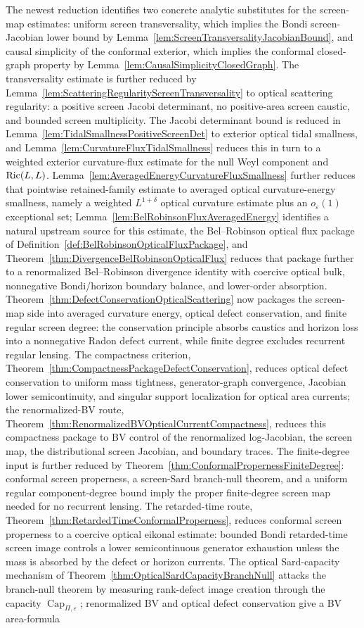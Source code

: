 The newest reduction identifies two concrete analytic substitutes for the screen-map estimates: uniform screen transversality, which implies the Bondi screen-Jacobian lower bound by Lemma~\ref{lem:ScreenTransversalityJacobianBound}, and causal simplicity of the conformal exterior, which implies the conformal closed-graph property by Lemma~\ref{lem:CausalSimplicityClosedGraph}. The transversality estimate is further reduced by Lemma~\ref{lem:ScatteringRegularityScreenTransversality} to optical scattering regularity: a positive screen Jacobi determinant, no positive-area screen caustic, and bounded screen multiplicity. The Jacobi determinant bound is reduced in Lemma~\ref{lem:TidalSmallnessPositiveScreenDet} to exterior optical tidal smallness, and Lemma~\ref{lem:CurvatureFluxTidalSmallness} reduces this in turn to a weighted exterior curvature-flux estimate for the null Weyl component and $\mathrm{Ric}(L,L)$. Lemma~\ref{lem:AveragedEnergyCurvatureFluxSmallness} further reduces that pointwise retained-family estimate to averaged optical curvature-energy smallness, namely a weighted $L^{1+\delta}$ optical curvature estimate plus an $o_\varepsilon(1)$ exceptional set; Lemma~\ref{lem:BelRobinsonFluxAveragedEnergy} identifies a natural upstream source for this estimate, the Bel--Robinson optical flux package of Definition~\ref{def:BelRobinsonOpticalFluxPackage}, and Theorem~\ref{thm:DivergenceBelRobinsonOpticalFlux} reduces that package further to a renormalized Bel--Robinson divergence identity with coercive optical bulk, nonnegative Bondi/horizon boundary balance, and lower-order absorption. Theorem~\ref{thm:DefectConservationOpticalScattering} now packages the screen-map side into averaged curvature energy, optical defect conservation, and finite regular screen degree: the conservation principle absorbs caustics and horizon loss into a nonnegative Radon defect current, while finite degree excludes recurrent regular lensing. The compactness criterion, Theorem~\ref{thm:CompactnessPackageDefectConservation}, reduces optical defect conservation to uniform mass tightness, generator-graph convergence, Jacobian lower semicontinuity, and singular support localization for optical area currents; the renormalized-BV route, Theorem~\ref{thm:RenormalizedBVOpticalCurrentCompactness}, reduces this compactness package to BV control of the renormalized log-Jacobian, the screen map, the distributional screen Jacobian, and boundary traces. The finite-degree input is further reduced by Theorem~\ref{thm:ConformalPropernessFiniteDegree}: conformal screen properness, a screen-Sard branch-null theorem, and a uniform regular component-degree bound imply the proper finite-degree screen map needed for no recurrent lensing. The retarded-time route, Theorem~\ref{thm:RetardedTimeConformalProperness}, reduces conformal screen properness to a coercive optical eikonal estimate: bounded Bondi retarded-time screen image controls a lower semicontinuous generator exhaustion unless the mass is absorbed by the defect or horizon currents. The optical Sard-capacity mechanism of Theorem~\ref{thm:OpticalSardCapacityBranchNull} attacks the branch-null theorem by measuring rank-defect image creation through the capacity $\operatorname{Cap}_{\Pi,\varepsilon}$; renormalized BV and optical defect conservation give a BV area-formula 